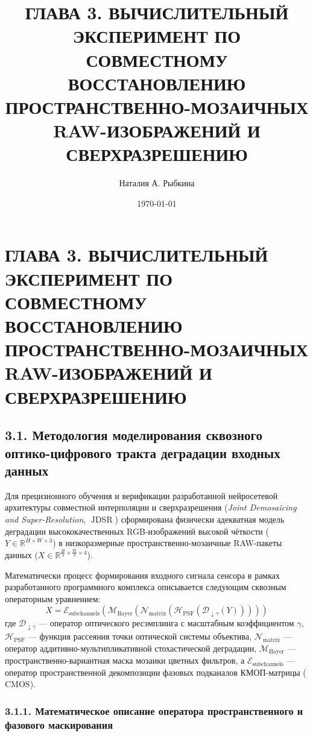 \documentclass[12pt,a4paper]{article}
\title{ГЛАВА 3. ВЫЧИСЛИТЕЛЬНЫЙ ЭКСПЕРИМЕНТ ПО СОВМЕСТНОМУ ВОССТАНОВЛЕНИЮ ПРОСТРАНСТВЕННО-МОЗАИЧНЫХ RAW-ИЗОБРАЖЕНИЙ И СВЕРХРАЗРЕШЕНИЮ}
\author{Наталия А. Рыбкина}
\date{\today}
\begin{document}
\maketitle

\tableofcontents

\section{ГЛАВА 3. ВЫЧИСЛИТЕЛЬНЫЙ ЭКСПЕРИМЕНТ ПО СОВМЕСТНОМУ ВОССТАНОВЛЕНИЮ ПРОСТРАНСТВЕННО-МОЗАИЧНЫХ RAW-ИЗОБРАЖЕНИЙ И СВЕРХРАЗРЕШЕНИЮ}

\subsection{3.1. Методология моделирования сквозного оптико-цифрового тракта деградации входных данных}

Для прецизионного обучения и верификации разработанной нейросетевой архитектуры совместной интерполяции и сверхразрешения (\textit{Joint Demosaicing and Super-Resolution}, $\operatorname{JDSR}$) сформирована физически адекватная модель деградации высококачественных RGB-изображений высокой чёткости ($Y \in \mathbb{R}^{H \times W \times 3}$) в низкоразмерные пространственно-мозаичные RAW-пакеты данных ($X \in \mathbb{R}^{\frac{H}{4} \times \frac{W}{4} \times 4}$). 

Математически процесс формирования входного сигнала сенсора в рамках разработанного программного комплекса описывается следующим сквозным операторным уравнением:
\begin{equation}
X = \mathcal{E}_{\operatorname{subchannels}} \left( \mathcal{M}_{\operatorname{Bayer}} \left( \mathcal{N}_{\operatorname{matrix}} \left( \mathcal{H}_{\operatorname{PSF}} \left( \mathcal{D}_{\downarrow \gamma} (Y) \right) \right) \right) \right)
\end{equation}
где $\mathcal{D}_{\downarrow \gamma}$ --- оператор оптического ресэмплинга с масштабным коэффициентом $\gamma$, $\mathcal{H}_{\operatorname{PSF}}$ --- функция рассеяния точки оптической системы объектива, $\mathcal{N}_{\operatorname{matrix}}$ --- оператор аддитивно-мультипликативной стохастической деградации, $\mathcal{M}_{\operatorname{Bayer}}$ --- пространственно-вариантная маска мозаики цветных фильтров, а $\mathcal{E}_{\operatorname{subchannels}}$ --- оператор пространственной декомпозиции фазовых подканалов КМОП-матрицы ($\text{CMOS}$).

\subsubsection{3.1.1. Математическое описание оператора пространственного и фазового маскирования}
\end{document}
